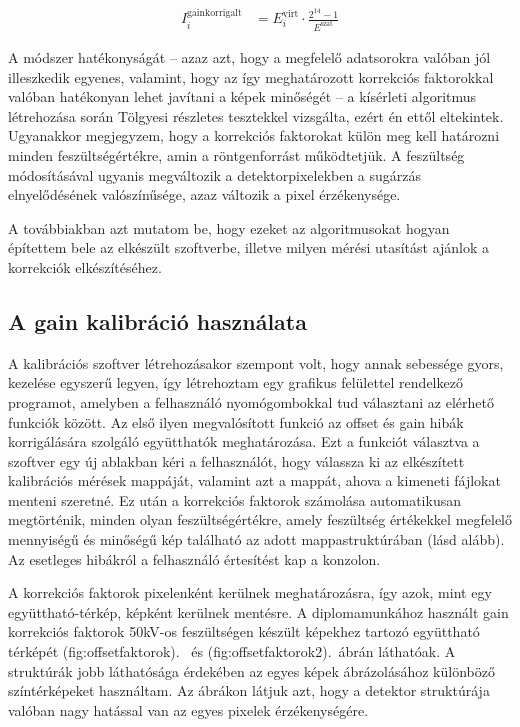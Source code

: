 \documentclass[a4paper,12pt]{article}
\begin{document}
\begin{equation}
\label{eq:gainkorrigalt}
\begin{split}
 I_i^{\text{gainkorrigalt}} &= E_i^{\text{virt}}  \cdot \frac{2^{14} -1}{E^\text{szat}}
 \end{split}
\end{equation}


A módszer hatékonyságát -- azaz azt, hogy a megfelelő adatsorokra valóban jól illeszkedik egyenes, valamint, hogy az így meghatározott korrekciós faktorokkal valóban hatékonyan lehet javítani a képek minőségét -- a kísérleti algoritmus létrehozása során Tölgyesi részletes tesztekkel vizsgálta\cite{botond}, ezért én ettől eltekintek. Ugyanakkor megjegyzem, hogy a korrekciós faktorokat külön meg kell határozni minden feszültségértékre, amin a röntgenforrást működtetjük. A feszültség módosításával ugyanis megváltozik a detektorpixelekben a sugárzás elnyelődésének valószínűsége, azaz változik a pixel érzékenysége.


A továbbiakban azt mutatom be, hogy ezeket az algoritmusokat hogyan építettem bele az elkészült szoftverbe, illetve milyen mérési utasítást ajánlok a korrekciók elkészítéséhez.


\subsection{A gain kalibráció használata}


A kalibrációs szoftver létrehozásakor szempont volt, hogy annak sebessége gyors, kezelése egyszerű legyen, így létrehoztam egy grafikus felülettel rendelkező programot, amelyben a felhasználó nyomógombokkal tud választani az elérhető funkciók között. Az első ilyen megvalósított funkció az offset és gain hibák korrigálására szolgáló együtthatók meghatározása. Ezt a funkciót választva a szoftver egy új ablakban kéri a felhasználót, hogy  válassza ki az elkészített kalibrációs mérések mappáját, valamint azt a mappát, ahova a kimeneti fájlokat menteni szeretné. Ez után a korrekciós faktorok számolása automatikusan megtörténik, minden olyan feszültségértékre, amely feszültség értékekkel megfelelő mennyiségű és minőségű kép található az adott mappastruktúrában (lásd alább). Az esetleges hibákról a felhasználó értesítést kap a konzolon.
 
 
 

A korrekciós faktorok  pixelenként kerülnek meghatározásra, így azok, mint egy együttható-térkép, képként  kerülnek mentésre.
 A diplomamunkához használt gain korrekciós faktorok 50kV-os feszültségen készült képekhez tartozó együttható térképét \aref({fig:offsetfaktorok}).~ és \aref({fig:offsetfaktorok2}).~ábrán láthatóak. A struktúrák jobb láthatósága érdekében az egyes képek ábrázolásához különböző színtérképeket használtam. Az ábrákon látjuk azt, hogy a detektor struktúrája valóban nagy hatással van az egyes pixelek érzékenységére. 
 
\end{document}
